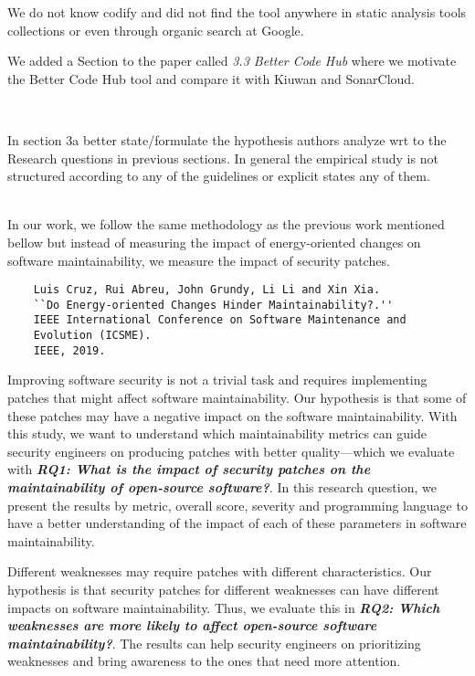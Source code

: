 \documentclass[11pt,fleqn]{article}
\newcommand{\eline}{\vspace*{.75\baselineskip}}
\newcommand{\Referee}[1]{\eline \noindent {\bf Reviewer comment #1:} \\}
\newcommand{\Us}{\eline \noindent {\bf Response:}\\}
\newenvironment{revcomment}[1][]
{\Referee{#1}\begin{rcomment}}
{\end{rcomment}}
\begin{document}
We do not know codify and did not find the tool anywhere in static analysis tools 
collections or even through organic search at Google.  

We added a Section to 
the paper called \textit{3.3 Better Code Hub} where we motivate the Better Code Hub tool and 
compare it with Kiuwan and SonarCloud.


\begin{revcomment}[3.2]

    In section 3a better state/formulate the hypothesis authors 
    analyze wrt to the Research questions in previous sections. 
    In general the empirical study is not structured according to any 
    of the guidelines or explicit states any of them. 

\end{revcomment}

\Us In our work, we follow the same methodology as the previous work 
mentioned bellow but instead of measuring
the impact of energy-oriented changes on software maintainability, 
we measure the impact of security patches.

\begin{verbatim}
    Luis Cruz, Rui Abreu, John Grundy, Li Li and Xin Xia. 
    ``Do Energy-oriented Changes Hinder Maintainability?.'' 
    IEEE International Conference on Software Maintenance and 
    Evolution (ICSME). 
    IEEE, 2019.
\end{verbatim}

Improving software security is not a trivial task and 
requires implementing patches that might affect software 
maintainability. Our hypothesis is that some of these patches may 
have a negative impact on the software maintainability. With this 
study, we want to understand which maintainability metrics can guide 
security engineers on producing patches with better quality---which 
we evaluate with \textit{\textbf{RQ1: What is the impact of security patches on the
maintainability of open-source software?}}. In this research 
question, we present the results by metric, overall score, severity and programming language
to have a better understanding of the impact of each of these parameters in 
software maintainability. 

Different weaknesses may require patches with different characteristics. 
Our hypothesis
is that security patches for different weaknesses can have different 
impacts on software maintainability. Thus, we evaluate this in \textit{\textbf{RQ2: Which weaknesses are more likely to
affect open-source software maintainability?}}. The results can help
security engineers on prioritizing weaknesses and bring awareness to the 
ones that need more attention.
\end{document}
